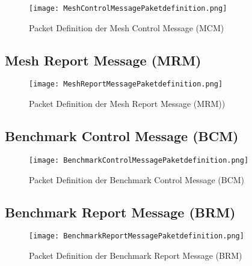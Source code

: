 
\begin{figure}[H]
	\centering
	\texttt{[image: MeshControlMessagePaketdefinition.png]}
	\caption{Packet Definition der Mesh Control Message (MCM)}\label{fig:MeshTestKonzept}
\end{figure}

\subsection{Mesh Report Message (MRM)}\label{subsec:MeshReportMessage}



\begin{figure}[H]
	\centering
	\texttt{[image: MeshReportMessagePaketdefinition.png]}
	\caption{Packet Definition der Mesh Report Message (MRM))}\label{fig:MeshTestKonzept}
\end{figure}

\subsection{Benchmark Control Message (BCM)}\label{subsec:BenchmarkControlMessage}


\begin{figure}[H]
	\centering
	\texttt{[image: BenchmarkControlMessagePaketdefinition.png]}
	\caption{Packet Definition der Benchmark Control Message (BCM)}\label{fig:MeshTestKonzept}
\end{figure}

\subsection{Benchmark Report Message (BRM)}\label{subsec:BenchmarkReportMessage}


\begin{figure}[H]
	\centering
	\texttt{[image: BenchmarkReportMessagePaketdefinition.png]}
	\caption{Packet Definition der Benchmark Report Message (BRM)}\label{fig:MeshTestKonzept}
\end{figure}


